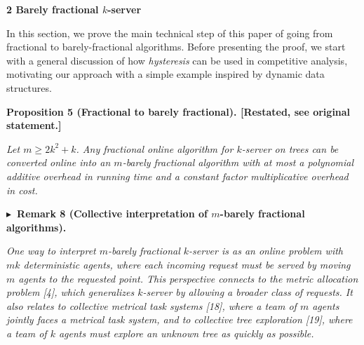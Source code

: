 \par\medskip\noindent\textbf{
2 Barely fractional $k$-server}\par




In this section, we prove the main technical step of this paper of going from fractional to barely-fractional algorithms. Before presenting the proof, we start with a general discussion of how \emph{hysteresis} can be used in competitive analysis, motivating our approach with a simple example inspired by dynamic data structures.\par






\par\medskip\noindent\textbf{
\textbf{Proposition 5}\textbf{ }(Fractional to barely fractional)\textbf{.}
[Restated, see original statement.]}\par



\emph{Let $m\geq 2k^{2}+k$. Any fractional online algorithm for $k$-server on trees can be converted online into an $m$-barely fractional algorithm with at most a polynomial additive overhead in running time and a constant factor multiplicative overhead in cost.}\par








\par\medskip\noindent\textbf{
$\blacktriangleright$ Remark 8 (Collective interpretation of $m$-barely fractional algorithms).
}\par



\emph{One way to interpret $m$-barely fractional $k$-server is as an online problem with $mk$ deterministic agents, where each incoming request must be served by moving $m$ agents to the requested point.
This perspective connects to the metric allocation problem [4], which generalizes $k$-server by allowing a broader class of requests. It also relates to collective metrical task systems [18], where a team of $m$ agents jointly faces a metrical task system, and to collective tree exploration [19], where a team of $k$ agents must explore an unknown tree as quickly as possible.}\par



